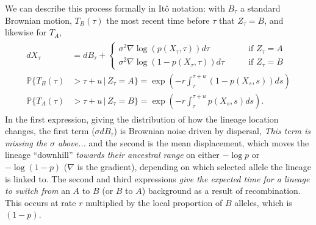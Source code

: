 \documentclass[11pt,letterpaper]{article}
\newcommand{\alisa}[1]{{\em \color{red} #1}}
\renewcommand{\P}{\mathbb{P}}
\newcommand{\grad}{\nabla}
\newcommand{\given}{\,\vert\,}
\begin{document}
We can describe this process formally in It\^o notation:
with $B_\tau$ a standard Brownian motion,
$T_B(\tau)$ the most recent time before $\tau$ that $Z_\tau = B$, and likewise for $T_A$,
\begin{align}
    \begin{aligned} \label{eqn:lineage_motion}
        dX_\tau &= dB_\tau + \begin{cases}
             \sigma^2 \grad \log(p(X_\tau,\tau)) d\tau \qquad & \text{if } Z_\tau = A \\
             \sigma^2 \grad \log(1-p(X_\tau,\tau)) d\tau \qquad & \text{if } Z_\tau = B 
        \end{cases} \\
        \P\{ T_B(\tau) &> \tau+u \given Z_\tau = A \} = \exp\left( - r \int_\tau^{\tau+u} (1-p(X_s,s)) ds \right) \\
        \P\{ T_A(\tau) &> \tau+u \given Z_\tau = B \} = \exp\left( - r \int_\tau^{\tau+u} p(X_s,s) ds \right) .
    \end{aligned}
\end{align}
In the first expression, giving the distribution of how the lineage location changes,
the first term ($\sigma dB_\tau$) is Brownian noise driven by dispersal, \alisa{This term is missing the $\sigma$ above...}
and the second is the mean displacement, which moves the lineage ``downhill'' \alisa{towards their ancestral range} on either $-\log p$ or $-\log (1-p)$
($\grad$ is the gradient),
depending on which selected allele the lineage is linked to.
The second and third expressions \alisa{give the expected time for a lineage to switch from} an $A$ to $B$ (or $B$ to $A$) background as a result of recombination. This occurs at rate $r$ multiplied by the local proportion of $B$ alleles, which is $(1-p)$.
\end{document}
